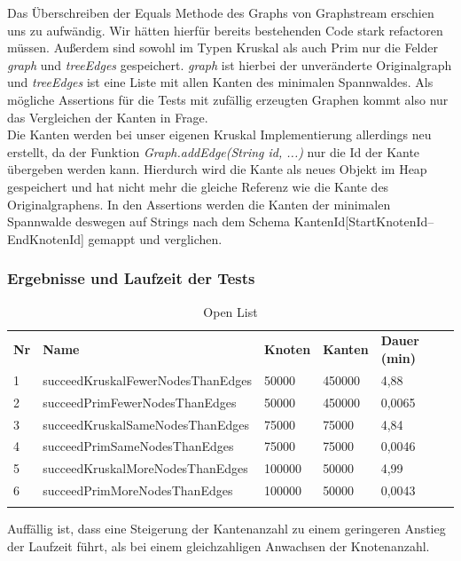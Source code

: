 \documentclass[a4paper]{article}
\begin{document}
Das Überschreiben der Equals Methode des Graphs von Graphstream erschien uns zu aufwändig. Wir hätten hierfür bereits bestehenden Code stark refactoren müssen. Außerdem sind sowohl im Typen Kruskal als auch Prim nur die Felder \textit{graph} und \textit{treeEdges} gespeichert. \textit{graph} ist hierbei der unveränderte Originalgraph und \textit{treeEdges} ist eine Liste mit allen Kanten des minimalen Spannwaldes. Als mögliche Assertions für die Tests mit zufällig erzeugten Graphen kommt also nur das Vergleichen der Kanten in Frage.\\
Die Kanten werden bei unser eigenen Kruskal Implementierung allerdings neu erstellt, da der Funktion \textit{Graph.addEdge(String id, ...)} nur die Id der Kante übergeben werden kann. Hierdurch wird die Kante als neues Objekt im Heap gespeichert und hat nicht mehr die gleiche Referenz wie die Kante des Originalgraphens. In den Assertions werden die Kanten der minimalen Spannwalde deswegen auf Strings nach dem Schema KantenId[StartKnotenId--EndKnotenId] gemappt und verglichen.

\subsubsection{Ergebnisse und Laufzeit der Tests}

\begin{table}[htbp]
    \centering
    \begin{tabular}{||l|l|l|l|l||}
    \hhline{|t:=====:t|}
    \textbf{Nr} & \textbf{Name} & \textbf{Knoten} & \textbf{Kanten} & \textbf{Dauer (min)} \\ \hhline{|-----|}
         1 & succeedKruskalFewerNodesThanEdges & 50000 & 450000 & 4,88 \\ \hhline{|-----|}
         2 & succeedPrimFewerNodesThanEdges & 50000 & 450000 & 0,0065 \\ \hhline{|-----|}
         3 & succeedKruskalSameNodesThanEdges & 75000 & 75000 & 4,84 \\ \hhline{|-----|}
         4 & succeedPrimSameNodesThanEdges & 75000 & 75000 & 0,0046 \\ \hhline{|-----|}
         5 & succeedKruskalMoreNodesThanEdges & 100000 & 50000 & 4,99 \\ \hhline{|-----|}
         6 & succeedPrimMoreNodesThanEdges & 100000 & 50000 & 0,0043 \\ \hhline{|b:=====:b|}
    \end{tabular}
    \caption{Open List}
\end{table}

Auffällig ist, dass eine Steigerung der Kantenanzahl zu einem geringeren Anstieg der Laufzeit führt, als bei einem gleichzahligen Anwachsen der Knotenanzahl.



\end{document}
